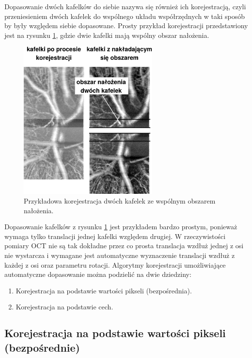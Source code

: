 Dopasowanie dwóch kafelków do siebie nazywa się również ich korejestracją, czyli przeniesieniem dwóch kafelek do wspólnego układu współrzędnych w taki sposób by były względem siebie dopasowane. Prosty przykład korejestracji przedstawiony jest na rysunku \ref{fig:algorytmy_korejestracji:align}, gdzie dwie kafelki mają wspólny obszar nałożenia.

\begin{figure}[H]
  \centering
  \includegraphics[width=7cm]{gfx/align}
  \caption{Przykładowa korejestracja dwóch kafelek ze wspólnym obszarem nałożenia.}
  \label{fig:algorytmy_korejestracji:align}
\end{figure}

Dopasowanie kafelków z rysunku \ref{fig:algorytmy_korejestracji:align} jest przykładem bardzo prostym, ponieważ wymaga tylko translacji jednej kafelki względem drugiej. W rzeczywistości pomiary OCT nie są tak dokładne przez co prosta translacja wzdłuż jednej z osi nie wystarcza i wymagane jest automatyczne wyznaczenie translacji wzdłuż z każdej z osi oraz parametru rotacji. Algorytmy korejestracji umożliwiające automatyczne dopasowanie można podzielić na dwie dziedziny:

\begin{enumerate}
\item Korejestracja na podstawie wartości pikseli (bezpośrednia).
\item Korejestracja na podstawie cech.
\end{enumerate}

\subsection{Korejestracja na podstawie wartości pikseli (bezpośrednie)}
\label{sec:algorytmy_korejestracji:korejestracja_na_podstawie_wartosci}

